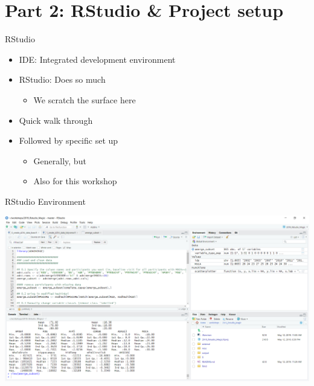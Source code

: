 \documentclass[
  ignorenonframetext,
]{beamer}
\providecommand{\tightlist}{%
  \setlength{\itemsep}{0pt}\setlength{\parskip}{0pt}}
\begin{document}
\hypertarget{part-2-rstudio-project-setup}{%
\section{Part 2: RStudio \& Project
setup}\label{part-2-rstudio-project-setup}}

\begin{frame}{RStudio}
\protect\hypertarget{rstudio}{}

\begin{itemize}
\tightlist
\item
  IDE: Integrated development environment
\item
  RStudio: Does so much

  \begin{itemize}
  \tightlist
  \item
    We scratch the surface here
  \end{itemize}
\item
  Quick walk through
\item
  Followed by specific set up

  \begin{itemize}
  \tightlist
  \item
    Generally, but
  \item
    Also for this workshop
  \end{itemize}
\end{itemize}

\end{frame}

\begin{frame}{RStudio Environment}
\protect\hypertarget{rstudio-environment}{}

\includegraphics{../external/images/rstudio_0_terminal_code.PNG}

\end{frame}
\end{document}
